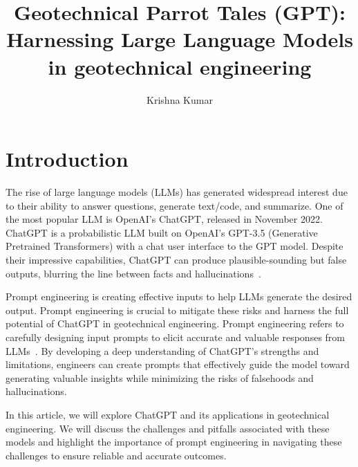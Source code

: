 \documentclass{article}
\title{Geotechnical Parrot Tales (GPT): Harnessing Large Language Models in geotechnical engineering}
\author{Krishna Kumar}
\date{}
\begin{document}
\maketitle

\section{Introduction}
The rise of large language models (LLMs) has generated widespread interest due to their ability to answer questions, generate text/code, and summarize. One of the most popular LLM is OpenAI's ChatGPT, released in November 2022. ChatGPT is a probabilistic LLM built on OpenAI's GPT-3.5 (Generative Pretrained Transformers) with a chat user interface to the GPT model. Despite their impressive capabilities, ChatGPT can produce plausible-sounding but false outputs, blurring the line between facts and hallucinations~\parencite{bender2021dangers}.

Prompt engineering is creating effective inputs to help LLMs generate the desired output. Prompt engineering is crucial to mitigate these risks and harness the full potential of ChatGPT in geotechnical engineering. Prompt engineering refers to carefully designing input prompts to elicit accurate and valuable responses from LLMs~\parencite{petroni2020context}. By developing a deep understanding of ChatGPT's strengths and limitations, engineers can create prompts that effectively guide the model toward generating valuable insights while minimizing the risks of falsehoods and hallucinations.

In this article, we will explore ChatGPT and its applications in geotechnical engineering. We will discuss the challenges and pitfalls associated with these models and highlight the importance of prompt engineering in navigating these challenges to ensure reliable and accurate outcomes.
\end{document}
